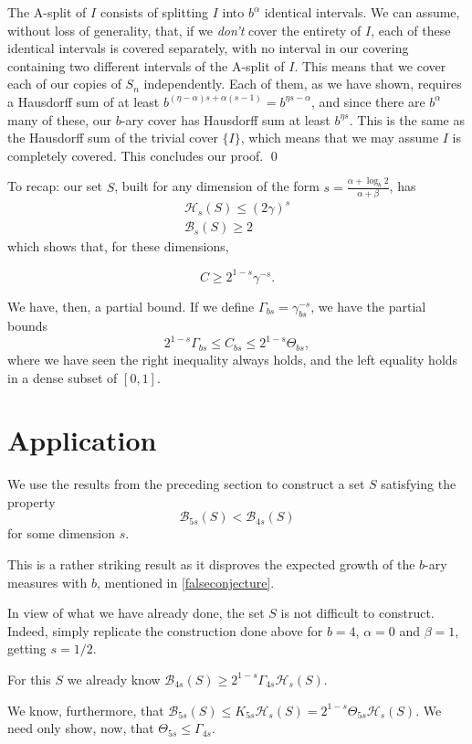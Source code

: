 \documentclass[11pt, reqno]{amsart}
\newcommand{\HH}{\mathcal{H}}
\newcommand{\BB}{\mathcal{B}}
\begin{document}
The A-split of $I$ consists of splitting $I$ into $b^\alpha$ identical intervals. We can assume, without loss of generality, that, if we \emph{don't} cover the entirety of $I$, each of these identical intervals is covered separately, with no interval in our covering containing two different intervals of the A-split of $I$. This means that we cover each of our copies of $S_n$ independently. Each of them, as we have shown, requires a Hausdorff sum of at least $b^{(\eta - \alpha)s + \alpha(s - 1)} = b^{\eta s - \alpha}$, and since there are $b^\alpha$ many of these, our $b$-ary cover has Hausdorff sum at least $b^{\eta s}$. This is the same as the Hausdorff sum of the trivial cover $\{I\}$, which means that we may assume $I$ is completely covered. This concludes our proof. \qed

To recap: our set $S$, built for any dimension of the form $s = \frac{\alpha + \log_b 2}{\alpha + \beta}$, has
\begin{gather*}
\HH_s(S) \leq (2\gamma)^s\\
\BB_s(S) \geq 2
\end{gather*}
which shows that, for these dimensions,

\[C \geq 2^{1-s} \gamma^{-s}.\]

We have, then, a partial bound. If we define $\Gamma_{bs} = \gamma_{bs}^{-s}$, we have the partial bounds
\[ 2^{1-s} \Gamma_{bs} \leq C_{bs} \leq 2^{1-s} \Theta_{bs},\]
where we have seen the right inequality always holds, and the left equality holds in a dense subset of $\left[0, 1 \right]$.

\section{Application}\label{secfinal}

We use the results from the preceding section to construct a set $S$ satisfying the property
\[ \BB_{5s}(S) < \BB_{4s}(S) \]
for some dimension $s$.

This is a rather striking result as it disproves the expected growth of the $b$-ary measures with $b$, mentioned in \eqref{falseconjecture}.

In view of what we have already done, the set $S$ is not difficult to construct. Indeed, simply replicate the construction done above for $b = 4$, $\alpha = 0$  and $\beta = 1$, getting $s = 1/2$.

For this $S$ we already know $\BB_{4s}(S) \geq 2^{1-s} \Gamma_{4s} \HH_s(S)$.

We know, furthermore, that $\BB_{5s}(S) \leq K_{5s} \HH_s(S) = 2^{1-s} \Theta_{5s} \HH_s(S)$. We need only show, now, that  $\Theta_{5s} \leq \Gamma_{4s}$.
\end{document}
